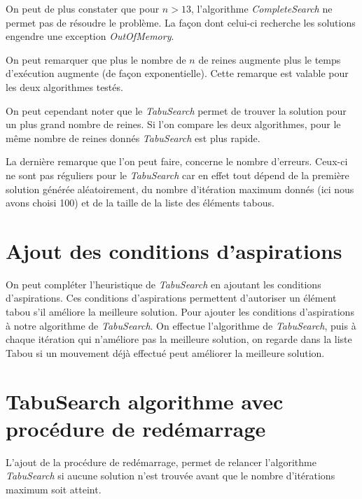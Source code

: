 \documentclass[a4paper,10pt]{article}
\begin{document}
On peut de plus constater que pour $n>13$, l'algorithme \emph{CompleteSearch} ne permet pas de résoudre le problème. La façon dont celui-ci recherche les solutions engendre une exception \emph{OutOfMemory}.

On peut remarquer que plus le nombre de $n$ de reines augmente plus le temps d'exécution augmente (de façon exponentielle). Cette remarque est valable pour les deux algorithmes testés.

On peut cependant noter que le \emph{TabuSearch} permet de trouver la solution pour un plus grand nombre de reines. Si l'on compare les deux algorithmes, pour le même nombre de reines donnés \emph{TabuSearch} est plus rapide.

La dernière remarque que l'on peut faire, concerne le nombre d'erreurs. Ceux-ci ne sont pas réguliers pour le \emph{TabuSearch} car en effet tout dépend de la première solution générée aléatoirement, du nombre d'itération maximum donnés (ici nous avons choisi 100) et de la taille de la liste des éléments tabous. 

\section{Ajout des conditions d'aspirations}
On peut compléter l'heuristique de \emph{TabuSearch} en ajoutant les conditions d'aspirations.
Ces conditions d'aspirations permettent d'autoriser un élément tabou s'il améliore la meilleure solution.
Pour ajouter les conditions d'aspirations à notre algorithme de \emph{TabuSearch}. On effectue l'algorithme de \emph{TabuSearch}, puis à chaque itération qui
n'améliore pas la meilleure solution, on regarde dans la liste Tabou si un mouvement déjà effectué peut améliorer la meilleure solution.

\section{TabuSearch algorithme avec procédure de redémarrage}
L'ajout de la procédure de redémarrage, permet de relancer l'algorithme \emph{TabuSearch} si aucune solution n'est trouvée avant que le nombre d'itérations maximum soit atteint.
\end{document}
